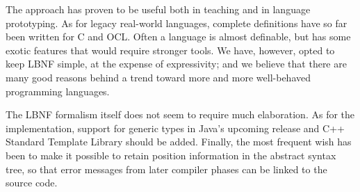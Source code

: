 \documentclass{llncs}
\begin{document}
The approach has proven to be useful both in teaching and
in language prototyping. As for legacy real-world languages, 
complete definitions have so far been written for C and OCL.
Often a language is almost definable, but has some
exotic features that would require stronger tools.
We have, however, opted to keep LBNF simple, at the expense
of expressivity; and we believe that there are many good reasons
behind a trend toward
more and more well-behaved programming languages.

The LBNF formalism itself does not seem to require much
elaboration. As for the implementation, support for generic types in Java's upcoming release and C++ Standard Template Library should be added. Finally, the most frequent wish has been
to make it possible to retain position information
in the abstract syntax tree, so that error messages from later
compiler phases can be linked to the source code.







\end{document}

